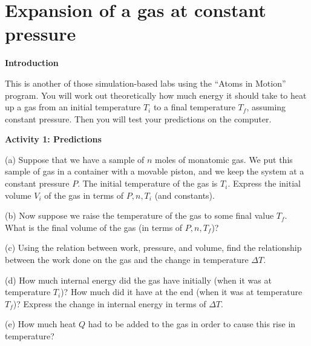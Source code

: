 \section{Expansion of a gas at constant pressure}
\begin{comment}
This lab was written by Ted Bunn for spring of 2016.  It was edited slightly by Matt Trawick for this manual in April 2016.

\end{comment}

\makelabheader %

\bigskip

\textbf{Introduction}

This is another of those simulation-based labs using the ``Atoms in
Motion'' program.  You will work out theoretically how much energy it
should take to heat up a gas from an initial temperature $T_i$
to a final temperature $T_f$, assuming constant pressure.  Then you will
test your predictions on the computer.

\bigskip

\textbf{Activity 1: Predictions}

(a) Suppose that we have a sample of $n$ moles of monatomic gas.
We put this sample of gas in a container with a movable
piston, and we keep the system at a constant pressure $P$.  The initial
temperature of the gas is $T_i$.  Express the initial volume $V_i$ of 
the gas in terms of $P,n,T_i$ (and constants).  

\answerspace{0.8in}

(b) Now suppose we raise the temperature of the gas to some final value
$T_f$.  What is the final volume of the gas (in terms of $P,n,T_f$)?

\answerspace{0.8in}

(c) Using the relation between work, pressure, and volume, find
the relationship between the work done on the gas and the change in temperature
$\Delta T$.

\answerspace{1in}%

(d) How much internal energy did the gas have initially (when it
was at temperature $T_i$)?  How much did it have at the end (when
it was at temperature $T_f$)?  Express the change in internal energy
in terms of $\Delta T$.

\answerspace{1.1in}%

(e) How much heat $Q$ had to be added to the gas in order to cause
this rise in temperature?  

